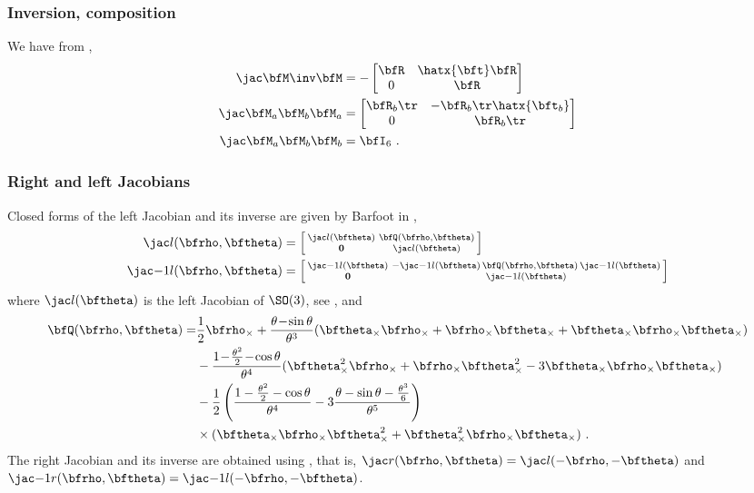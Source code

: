 \subsubsection{Inversion, composition}

We have from ,
%
\begin{align}
\mjac{\bfM\inv}{\bfM} &= - \begin{bmatrix}
  \bfR & \hatx{\bft}\bfR \\ 0 & \bfR
  \end{bmatrix} \\
\mjac{\bfM_a\bfM_b}{\bfM_a} &=   \begin{bmatrix}
  \bfR_b\tr & -\bfR_b\tr\hatx{\bft_b} \\ 0 & \bfR_b\tr
  \end{bmatrix} \\
\mjac{\bfM_a\bfM_b}{\bfM_b} &= \bfI_6  
~.
\end{align}

\subsubsection{Right and left Jacobians}

Closed forms of the left Jacobian and its inverse are given by Barfoot in \cite{BARFOOT-14},
%
\begin{subequations}
\begin{align}
\mjac{}{l}(\bfrho,\bth) &= \begin{bsmallmatrix}
\mjac{}{l}(\bth) & \bfQ(\bfrho,\bth) \\
\bf0 & \mjac{}{l}(\bth)
\end{bsmallmatrix}
\\
\mjac{-1}{l}(\bfrho,\bth) &= \begin{bsmallmatrix}
\mjac{-1}{l}(\bth) & -\mjac{-1}{l}(\bth)\,\bfQ(\bfrho,\bth)\,\mjac{-1}{l}(\bth) \\
\bf0 & \mjac{-1}{l}(\bth)
\end{bsmallmatrix}
\end{align}
\end{subequations}
%
where $\mjac{}{l}(\bth)$ is the left Jacobian of $\SO(3)$, see , and
%
\newcommand{\rhox}{\bfrho_\times}
\newcommand{\bthx}{\bth_\times}
%
\begin{align}
\bfQ(\bfrho,\bth) =& 
  \frac12\rhox 
  + \frac{\theta\!-\!\sin\theta}{\theta^3}(\bthx\rhox+\rhox\bthx+\bthx\rhox\bthx) 
  \notag\\
  &- \frac{1\! - \!\frac{\theta^2}{2}\! -\! \cos\theta}{\theta^4}(\bthx^2\rhox+\rhox\bthx^2-3\bthx\rhox\bthx)
  \notag\\
  &-\frac12\left(\frac{1 -  \frac{\theta^2}{2} - \cos\theta}{\theta^4} 
                  - 3\frac{\theta-\sin\theta-\frac{\theta^3}{6}}{\theta^5}\right)
  \notag\\
  &\times (\bthx\rhox\bthx^2 + \bthx^2\rhox\bthx)
~.
\end{align}
%
The right Jacobian and its inverse are obtained using , that is, $\mjac{}{r}(\bfrho,\bth)=\mjac{}{l}(-\bfrho,-\bth)$ and $\mjac{-1}{r}(\bfrho,\bth)=\mjac{-1}{l}(-\bfrho,-\bth)$. 

